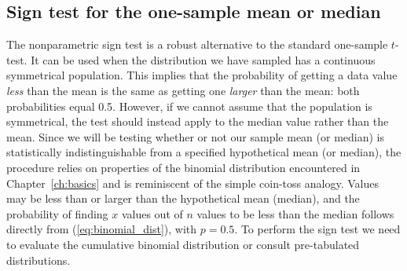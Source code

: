 \subsection{Sign test for the one-sample mean or median}

The nonparametric sign test is a robust alternative to the standard one-sample $t$-test.
It can be used when the distribution we have sampled has a continuous symmetrical population.
This implies that the probability of getting a data value \emph{less} than the mean is the same as
getting one \emph{larger} than the mean: both probabilities equal 0.5.  However, if we cannot assume
that the population is symmetrical, the test should instead apply to the median value rather than the mean.
Since we will be testing whether or not our sample mean (or median) is statistically indistinguishable
from a specified hypothetical mean (or median), the procedure relies on properties of the binomial
distribution encountered in Chapter~\ref{ch:basics} and is reminiscent of the simple coin-toss analogy.
Values may be less than or larger than the hypothetical mean (median), and the probability of finding
$x$ values out of $n$ values to be less than the median follows directly from (\ref{eq:binomial_dist}), with $p = 0.5$.
To perform the sign test we need to evaluate the cumulative binomial distribution or consult pre-tabulated distributions.
